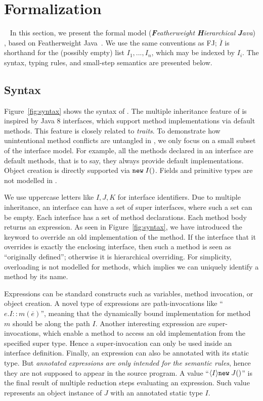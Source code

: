 \section{Formalization}~\label{sec:formalization}
In this section, we present the formal model \MIM{} (\emph{\textbf{F}eatherweight \textbf{H}ierarchical \textbf{J}ava}) , based on
Featherweight Java~\cite{Igarashi01FJ}. We use the same
conventions as FJ; $\overline{I}$ is shorthand for the (possibly empty)
list $I_1, ..., I_n$, which may be indexed by $I_i$.
The syntax, typing rules, and small-step semantics are presented below.

\vspace{-2ex}
\subsection{Syntax}
Figure~\ref{fig:syntax} shows the syntax of \MIM{}. The multiple
inheritance feature of \MIM{} is inspired by Java 8 interfaces, which support
method implementations via default methods. This feature is 
closely related to \emph{traits}. To demonstrate how
unintentional method conflicts are untangled in \MIM{}, we only focus on a small
subset of the interface model. For example, all the methods declared
in an interface are default methods, that is to say, they always
provide default implementations. 
Object creation is directly supported via $\texttt{new} \; I()$. 
Fields and primitive types are not modelled in \MIM{}.

We use uppercase letters like $I, J, K$ for interface identifiers. 
Due to multiple inheritance, an interface can have a set of
super interfaces, where such a set can be empty. Each interface
has a set of method declarations. Each method body returns
an expression. As seen in Figure~\ref{fig:syntax}, we have introduced the
\kwoverride{} keyword to override an old implementation of the
method. If the interface that it overrides is exactly the enclosing
interface, then such a method is seen as ``originally defined''; otherwise
it is hierarchical overriding.
For simplicity, overloading is not modelled for methods, which
implies we can uniquely identify a method by its name.

Expressions can be standard constructs such as variables, method
invocation, or object creation. A novel type of expressions are path-invocations like
``$e.I::m(\overline{e})$'', meaning that the dynamically bound
implementation for method $m$ should be along the path $I$. Another
interesting expression are super-invocations, which enable a method to access an old
implementation from the specified super type. Hence a super-invocation
can only be used inside an interface definition.
Finally, an expression can also be annotated with its static type. But \emph{annotated expressions are only intended for the semantic rules},
hence they are not supposed to appear in the source program. A value
``$\langle I \rangle\texttt{new} \; J()$''
is the final result of multiple reduction steps evaluating an
expression. Such value represents an object instance
of $J$ with an annotated static type $I$.

